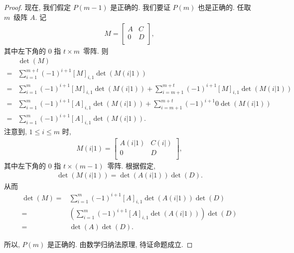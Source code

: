 \begin{proof}
    现在, 我们假定 \(P(m-1)\) 是正确的.
    我们要证 \(P(m)\) 也是正确的.
    任取 \(m\)~级阵 \(A\).
    记
    \begin{align*}
        M = \begin{bmatrix}
                A & C \\
                0 & D \\
            \end{bmatrix},
    \end{align*}
    其中左下角的 \(0\) 指 \(t \times m\)~零阵.
    则
    \begin{align*}
             & \det {(M)}
        \\
        = {} & \sum_{i = 1}^{m+t}
        {(-1)^{i+1} [M]_{i,1} \det {(M(i|1))}}
        \\
        = {} & \sum_{i = 1}^{m}
        {(-1)^{i+1} [M]_{i,1} \det {(M(i|1))}}
        +
        \sum_{i = m+1}^{m+t}
        {(-1)^{i+1} [M]_{i,1} \det {(M(i|1))}}
        \\
        = {} & \sum_{i = 1}^{m}
        {(-1)^{i+1} [A]_{i,1} \det {(M(i|1))}}
        +
        \sum_{i = m+1}^{m+t}
        {(-1)^{i+1} 0 \det {(M(i|1))}}
        \\
        = {} & \sum_{i = 1}^{m}
        {(-1)^{i+1} [A]_{i,1} \det {(M(i|1))}}.
    \end{align*}
    注意到, \(1 \leq i \leq m\) 时,
    \begin{align*}
        M(i|1)
        = \begin{bmatrix}
              A(i|1) & C(i|) \\
              0      & D     \\
          \end{bmatrix},
    \end{align*}
    其中左下角的 \(0\) 指 \(t \times (m-1)\)~零阵.
    根据假定,
    \begin{align*}
        \det {(M(i|1))} = \det {(A(i|1))} \det {(D)}.
    \end{align*}
    从而
    \begin{align*}
        \det {(M)}
        = {} & \sum_{i = 1}^{m}
        {(-1)^{i+1} [A]_{i,1} \det {(A(i|1))} \det {(D)}}
        \\
        = {} & \left(\sum_{i = 1}^{m}
        {(-1)^{i+1} [A]_{i,1} \det {(A(i|1))}}\right)
        \det {(D)}
        \\
        = {} & \det {(A)} \det {(D)}.
    \end{align*}

    所以, \(P(m)\) 是正确的.
    由数学归纳法原理, 待证命题成立.
\end{proof}

